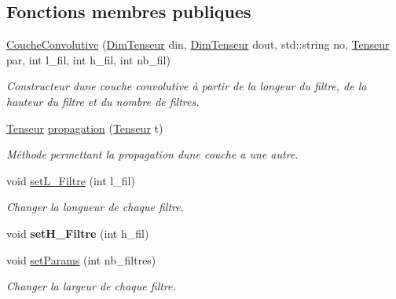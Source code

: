\subsection*{Fonctions membres publiques}
\begin{DoxyCompactItemize}
\item 
\hyperlink{classCoucheConvolutive_ac0e9fc1269646ff46ab9ea2a26489123}{Couche\+Convolutive} (\hyperlink{classDimTenseur}{Dim\+Tenseur} din, \hyperlink{classDimTenseur}{Dim\+Tenseur} dout, std\+::string no, \hyperlink{classTenseur}{Tenseur} par, int l\+\_\+fil, int h\+\_\+fil, int nb\+\_\+fil)
\begin{DoxyCompactList}\small\item\em Constructeur d\textquotesingle{}une couche convolutive à partir de la longeur du filtre, de la hauteur du filtre et du nombre de filtres. \end{DoxyCompactList}\item 
\hyperlink{classTenseur}{Tenseur} \hyperlink{classCoucheConvolutive_ad1a55b3dc9bf52e0725ae2a7b2e92aa1}{propagation} (\hyperlink{classTenseur}{Tenseur} t)
\begin{DoxyCompactList}\small\item\em Méthode permettant la propagation d\textquotesingle{}une couche a une autre. \end{DoxyCompactList}\item 
\mbox{\label{classCoucheConvolutive_a1923173423085bc194b2484ff7b6d922}} 
void \hyperlink{classCoucheConvolutive_a1923173423085bc194b2484ff7b6d922}{set\+L\+\_\+\+Filtre} (int l\+\_\+fil)
\begin{DoxyCompactList}\small\item\em Changer la longueur de chaque filtre. \end{DoxyCompactList}\item 
\mbox{\label{classCoucheConvolutive_a352b530060db1a2b20a8df3f9daaf026}} 
void {\bfseries set\+H\+\_\+\+Filtre} (int h\+\_\+fil)
\item 
void \hyperlink{classCoucheConvolutive_a30fd844fc3a96f2e90d1a20251b1bfe3}{set\+Params} (int nb\+\_\+filtres)
\begin{DoxyCompactList}\small\item\em Changer la largeur de chaque filtre. \end{DoxyCompactList}\end{DoxyCompactItemize}


